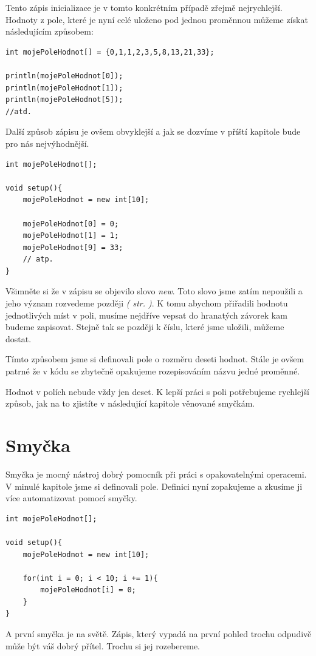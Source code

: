 \documentclass[10pt]{book}
\newcommand{\oddil}[1]{\section{#1}\index{#1}\label{#1}}
\newcommand{\vyraz}[1]{\textit{\gls{#1}}\index{#1}\label{#1}}
\newcommand{\odkaz}[1]{\textit{(\nameref{#1} str. \pageref*{#1})}}
\begin{document}
Tento zápis inicializace je v tomto konkrétním případě zřejmě nejrychlejší. Hodnoty z pole, které je nyní celé uloženo pod jednou proměnnou můžeme získat následujícím způsobem:

\begin{lstlisting}
int mojePoleHodnot[] = {0,1,1,2,3,5,8,13,21,33};

println(mojePoleHodnot[0]);
println(mojePoleHodnot[1]);
println(mojePoleHodnot[5]);
//atd.
\end{lstlisting}


Další způsob zápisu je ovšem obvyklejší a jak se dozvíme v příští kapitole bude pro nás nejvýhodnější.


\begin{lstlisting}
int mojePoleHodnot[];

void setup(){
	mojePoleHodnot = new int[10];
	
	mojePoleHodnot[0] = 0;
	mojePoleHodnot[1] = 1;
	mojePoleHodnot[9] = 33;
	// atp.
}
\end{lstlisting}

Všimněte si že v zápisu se objevilo slovo \vyraz{new}. Toto slovo jsme zatím nepoužili a jeho význam rozvedeme později \odkaz{Objekt}. K tomu abychom přiřadili hodnotu jednotlivých míst v poli, musíme nejdříve vepsat do hranatých závorek kam budeme zapisovat. Stejně tak se později k číslu, které jsme uložili, můžeme dostat. 

Tímto způsobem jsme si definovali pole o rozměru deseti hodnot. Stále je ovšem patrné že v kódu se zbytečně opakujeme rozepisováním názvu jedné proměnné.

Hodnot v polích nebude vždy jen deset. K lepší práci s poli potřebujeme rychlejší způsob, jak na to zjistíte v následující kapitole věnované smyčkám.


\oddil{Smyčka}


Smyčka je mocný nástroj dobrý pomocník při práci s opakovatelnými operacemi. V minulé kapitole jsme si definovali pole. Definici nyní zopakujeme a zkusíme ji více automatizovat pomocí smyčky.

\begin{lstlisting}
int mojePoleHodnot[];

void setup(){
	mojePoleHodnot = new int[10];
	
	for(int i = 0; i < 10; i += 1){
		mojePoleHodnot[i] = 0;
	}
}
\end{lstlisting}

A první smyčka je na světě. Zápis, který vypadá na první pohled trochu odpudivě může být váš dobrý přítel. Trochu si jej rozebereme. 
\end{document}
